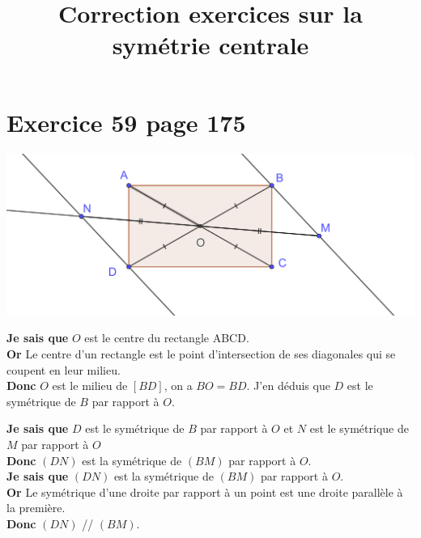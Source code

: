 \documentclass[12pt,a4paper]{article}
\date{}
\title{Correction exercices sur la symétrie centrale}
\begin{document}
	
\maketitle

\vspace*{-3cm}
%
%


%

\section*{Exercice 59 page 175}


\begin{center}
	\includegraphics[scale=0.2]{59}
\end{center}


\noindent \textbf{Je sais que} $O$ est le centre du rectangle ABCD.\\
\textbf{Or} Le centre d'un rectangle est le point d'intersection de ses diagonales qui se coupent en leur milieu.\\
\textbf{Donc} $O$ est le milieu de $[BD]$, on a $BO = BD$.
J'en déduis que $D$ est le symétrique de $B$ par rapport à $O$. 




\noindent \textbf{Je sais que} $D$ est le symétrique de $B$ par rapport à $O$ et $N$ est le symétrique de $M$ par rapport à $O$\\
\textbf{Donc} $(DN)$ est la symétrique de $(BM)$ par rapport à $O$.\\

\noindent \textbf{Je sais que} $(DN)$ est la symétrique de $(BM)$ par rapport à $O$.\\
\textbf{Or} Le symétrique d'une droite par rapport à un point est une droite parallèle à la première.\\
\textbf{Donc} $(DN)$ // $(BM)$.\\
\end{document}
